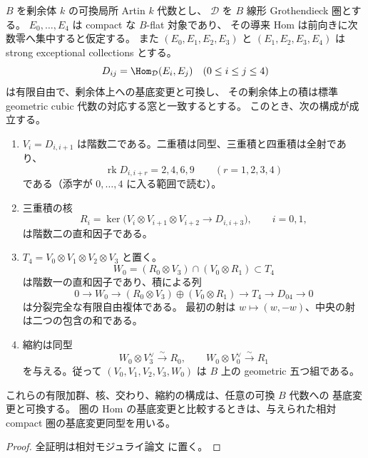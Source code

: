 \begin{lemma}
\label{lem:cubic-artin-overlap-recovery}
$B$ を剰余体 $k$ の可換局所 Artin $k$ 代数とし、
$\mathcal D$ を $B$ 線形 Grothendieck 圏とする。
$E_0,\ldots,E_4$ は compact な $B$-flat 対象であり、
その導来 Hom は前向きに次数零へ集中すると仮定する。
また $(E_0,E_1,E_2,E_3)$ と $(E_1,E_2,E_3,E_4)$ は strong exceptional collections とする。
\[
 D_{ij}=\Hom_{\mathcal D}(E_i,E_j)\quad(0\le i\le j\le4)
\]
は有限自由で、剰余体上への基底変更と可換し、
その剰余体上の積は標準 geometric cubic 代数の対応する窓と一致するとする。
このとき、次の構成が成立する。
\begin{enumerate}
\item $V_i=D_{i,i+1}$ は階数二である。二重積は同型、三重積と四重積は全射であり、
\[
 \operatorname{rk}D_{i,i+r}=2,4,6,9\qquad(r=1,2,3,4)
\]
である（添字が $0,\ldots,4$ に入る範囲で読む）。
\item 三重積の核
\[
 R_i=\ker\bigl(V_i\otimes V_{i+1}\otimes V_{i+2}\longrightarrow D_{i,i+3}\bigr),
 \qquad i=0,1,
\]
は階数二の直和因子である。
\item $T_4=V_0\otimes V_1\otimes V_2\otimes V_3$ と置く。
\[
 W_0=(R_0\otimes V_3)\cap(V_0\otimes R_1)\subset T_4
\]
は階数一の直和因子であり、積による列
\begin{equation}\label{eq:artin-overlap-complex}
0\longrightarrow W_0\longrightarrow
 (R_0\otimes V_3)\oplus(V_0\otimes R_1)
 \longrightarrow T_4\longrightarrow D_{04}\longrightarrow0
\end{equation}
は分裂完全な有限自由複体である。
最初の射は $w\mapsto(w,-w)$、中央の射は二つの包含の和である。
\item 縮約は同型
\begin{equation}\label{eq:artin-contraction-isos}
 W_0\otimes V_3^\vee\xrightarrow{\sim}R_0,
 \qquad
 W_0\otimes V_0^\vee\xrightarrow{\sim}R_1
\end{equation}
を与える。従って $(V_0,V_1,V_2,V_3,W_0)$ は $B$ 上の geometric 五つ組である。
\end{enumerate}
これらの有限加群、核、交わり、縮約の構成は、任意の可換 $B$ 代数への
基底変更と可換する。
圏の Hom の基底変更と比較するときは、与えられた相対 compact 圏の基底変更同型を用いる。
\end{lemma}

\begin{proof}
全証明は相対モジュライ論文 \cite[\texttt{cubic_smooth_atlas}]{QuadricModuli2026} に置く。
\end{proof}


